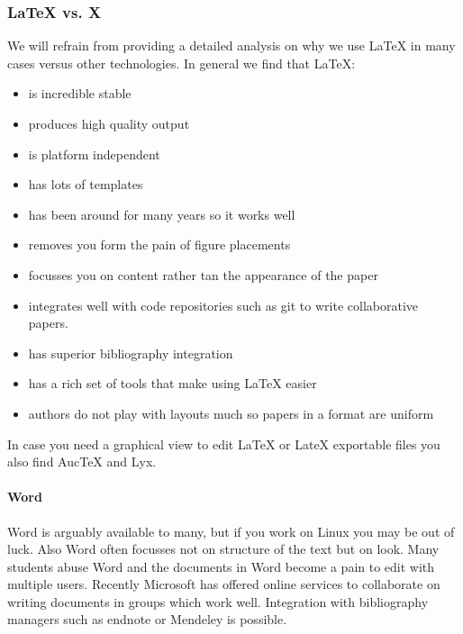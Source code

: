 \subsubsection{LaTeX vs. X}
\label{\detokenize{lesson/doc/latex:latex-vs-x}}
We will refrain from providing a detailed analysis on why we use LaTeX
in many cases versus other technologies. In general we find that LaTeX:
\begin{itemize}
\item {} 
is incredible stable

\item {} 
produces high quality output

\item {} 
is platform independent

\item {} 
has lots of templates

\item {} 
has been around for many years so it works well

\item {} 
removes you form the pain of figure placements

\item {} 
focusses you on content rather tan the appearance of the paper

\item {} 
integrates well with code repositories such as git to write
collaborative papers.

\item {} 
has superior bibliography integration

\item {} 
has a rich set of tools that make using LaTeX easier

\item {} 
authors do not play with layouts much so papers in a format are uniform

\end{itemize}

In case you need a graphical view to edit LaTeX or LateX exportable
files you also find AucTeX and Lyx.


\paragraph{Word}
\label{\detokenize{lesson/doc/latex:word}}
Word is arguably available to many, but if you work on Linux you may
be out of luck. Also Word often focusses not on structure of the text
but on look. Many students abuse Word and the documents in Word become
a pain to edit with multiple users. Recently Microsoft has offered
online services to collaborate on writing documents in groups which
work well. Integration with bibliography managers such as endnote or
Mendeley is possible.

